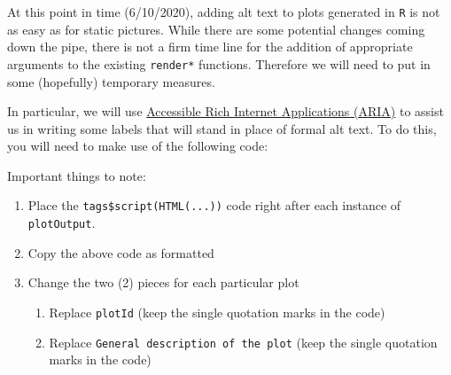 \documentclass[
]{book}
\newenvironment{Shaded}{\begin{snugshade}}{\end{snugshade}}
\newcommand{\CommentTok}[1]{\textcolor[rgb]{0.56,0.35,0.01}{\textit{#1}}}
\newcommand{\DataTypeTok}[1]{\textcolor[rgb]{0.13,0.29,0.53}{#1}}
\newcommand{\KeywordTok}[1]{\textcolor[rgb]{0.13,0.29,0.53}{\textbf{#1}}}
\newcommand{\NormalTok}[1]{#1}
\newcommand{\OperatorTok}[1]{\textcolor[rgb]{0.81,0.36,0.00}{\textbf{#1}}}
\newcommand{\StringTok}[1]{\textcolor[rgb]{0.31,0.60,0.02}{#1}}
\providecommand{\tightlist}{%
  \setlength{\itemsep}{0pt}\setlength{\parskip}{0pt}}
\begin{document}
At this point in time (6/10/2020), adding alt text to plots generated in \texttt{R} is not as easy as for static pictures. While there are some potential changes coming down the pipe, there is not a firm time line for the addition of appropriate arguments to the existing \texttt{render*} functions. Therefore we will need to put in some (hopefully) temporary measures.

In particular, we will use \href{https://developer.mozilla.org/en-US/docs/Web/Accessibility/ARIA}{Accessible Rich Internet Applications (ARIA)} to assist us in writing some labels that will stand in place of formal alt text. To do this, you will need to make use of the following code:

\begin{Shaded}
\end{Shaded}

Important things to note:

\begin{enumerate}
\def\labelenumi{\arabic{enumi}.}
\tightlist
\item
  Place the \texttt{tags\$script(HTML(...))} code right after each instance of \texttt{plotOutput}.
\item
  Copy the above code as formatted
\item
  Change the two (2) pieces for each particular plot

  \begin{enumerate}
  \def\labelenumii{\alph{enumii}.}
  \tightlist
  \item
    Replace \texttt{plotId} (keep the single quotation marks in the code)
  \item
    Replace \texttt{General\ description\ of\ the\ plot} (keep the single quotation marks in the code)
  \end{enumerate}
\end{enumerate}
\end{document}
